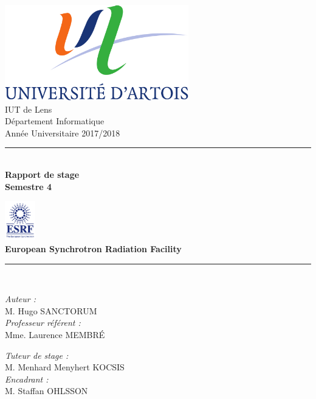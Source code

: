 \documentclass[a4paper,12pt]{book}
\theoremstyle{break}
\begin{document}

\begin{titlepage}
\begin{center}

\includegraphics[width=0.6\textwidth]{Universite_Artois_Logo.png}\\[1cm]

{\large IUT de Lens}\\[0.5cm]

{\large Département Informatique}\\[0.5cm]

{\large Année Universitaire 2017/2018}\\[0.5cm]

\rule{\linewidth}{0.5mm} \\[0.4cm]


{\huge \bfseries Rapport de stage\\}
{\Large \bfseries Semestre 4 \\[0.4cm]}


\includegraphics[width=0.1\textwidth]{ESRF_Logo.png}\\
{\large \bfseries European Synchrotron Radiation Facility}\\[0.4cm]

\rule{\linewidth}{0.5mm} \\[1cm]

\noindent
\begin{minipage}{0.5\textwidth}
  \begin{flushleft} \large
    \emph{Auteur :}\\
    M. Hugo \textsc{SANCTORUM}\\
    \emph{Professeur référent :}\\
    Mme. Laurence \textsc{MEMBRÉ}
  \end{flushleft}
\end{minipage}%
\begin{minipage}{0.5\textwidth} 
  \begin{flushright} \large 
    \emph{Tuteur de stage :} \\
    M. Menhard Menyhert \textsc{KOCSIS}\\
    \emph{Encadrant :} \\
    M. Staffan \textsc{OHLSSON}\\
  \end{flushright}
\end{minipage}


\end{center}
\end{titlepage}
\end{document}
